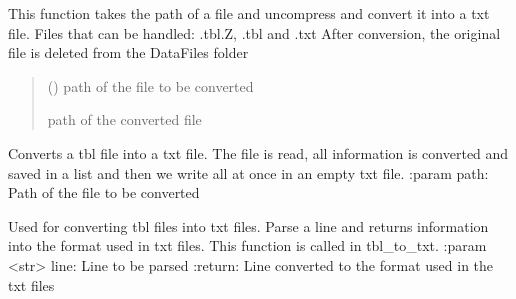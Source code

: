 \documentclass[letterpaper,10pt,english]{sphinxmanual}
\begin{document}
\begin{fulllineitems}
\label{\detokenize{converter:converter.handle_file}}
\pysigstartsignatures
{}
\pysigstopsignatures
\sphinxAtStartPar
This function takes the path of a file and uncompress and convert it into a txt file.
Files that can be handled: .tbl.Z, .tbl and .txt
After conversion, the original file is deleted from the DataFiles folder
\begin{quote}\begin{description}
\sphinxAtStartPar
{} () \textendash{} path of the file to be converted

\sphinxAtStartPar
path of the converted file

\end{description}\end{quote}

\end{fulllineitems}


\begin{fulllineitems}
\label{\detokenize{converter:converter.tbl_to_txt}}
\pysigstartsignatures
{}
\pysigstopsignatures
\sphinxAtStartPar
Converts a tbl file into a txt file. The file is read, all information is converted and saved in a list and then we write all at once in an empty txt file.
:param path: Path of the file to be converted

\end{fulllineitems}


\begin{fulllineitems}
\label{\detokenize{converter:converter.traducer}}
\pysigstartsignatures
{}
\pysigstopsignatures
\sphinxAtStartPar
Used for converting tbl files into txt files. Parse a line and returns information into the format used in txt files.
This function is called in tbl\_to\_txt.
:param \textless{}str\textgreater{} line: Line to be parsed
:return: Line converted to the format used in the txt files

\end{fulllineitems}
\end{document}
